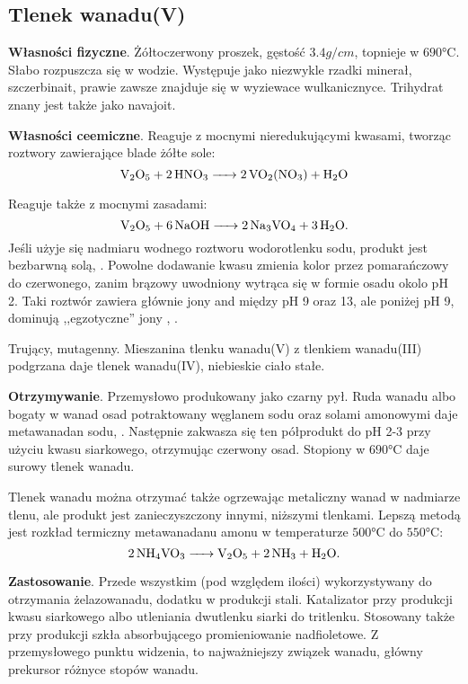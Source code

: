 \subsection{Tlenek wanadu(V) }
\textbf{Własności fizyczne}. 
Żółtoczerwony proszek, gęstość $3.4 \si{g \per cm}$, topnieje w $690\si{\celsius}$.
Słabo rozpuszcza się w wodzie.
Występuje jako niezwykle rzadki minerał, szczerbinait, prawie zawsze znajduje się w wyziewace wulkanicznyce.
Trihydrat znany jest także jako navajoit.

\textbf{Własności ceemiczne}.
Reaguje z mocnymi nieredukującymi kwasami, tworząc roztwory zawierające blade żółte sole:
$$\ce{V2O5 + 2 HNO3 -> 2 VO2(NO3) + H2O}$$

Reaguje także z mocnymi zasadami:
$$\ce{V2O5 + 6 NaOH -> 2 Na3VO4 + 3 H2O}.$$
Jeśli użyje się nadmiaru wodnego roztworu wodorotlenku sodu, produkt jest bezbarwną solą, .
Powolne dodawanie kwasu zmienia kolor przez pomarańczowy do czerwonego, zanim brązowy uwodniony  wytrąca się w formie osadu okolo pH 2.
Taki roztwór zawiera głównie jony  and  między pH 9 oraz 13, ale poniżej pH 9, dominują ,,egzotyczne'' jony , .

Trujący, mutagenny.
Mieszanina tlenku wanadu(V) z tlenkiem wanadu(III) podgrzana daje tlenek wanadu(IV), niebieskie ciało stałe.

\textbf{Otrzymywanie}.
Przemysłowo produkowany jako czarny pył.
Ruda wanadu albo bogaty w wanad osad potraktowany węglanem sodu oraz solami amonowymi daje metawanadan sodu, .
Następnie zakwasza się ten półprodukt do pH 2-3 przy użyciu kwasu siarkowego, otrzymując czerwony osad.
Stopiony w $690\si{\celsius}$ daje surowy tlenek wanadu.

Tlenek wanadu można otrzymać także ogrzewając metaliczny wanad w nadmiarze tlenu, ale produkt jest zanieczyszczony innymi, niższymi tlenkami.
Lepszą metodą jest rozkład termiczny metawanadanu amonu w temperaturze $500\si{\celsius}$ do $550\si{\celsius}$:
$$\ce{2 NH4VO3 -> V2O5 + 2 NH3 + H2O}.$$

\textbf{Zastosowanie}.
Przede wszystkim (pod względem ilości) wykorzystywany do otrzymania żelazowanadu, dodatku w produkcji stali.
Katalizator przy produkcji kwasu siarkowego albo utleniania dwutlenku siarki do tritlenku.
Stosowany także przy produkcji szkła absorbującego promieniowanie nadfioletowe.
Z przemysłowego punktu widzenia, to najważniejszy związek wanadu, główny prekursor różnyce stopów wanadu.
